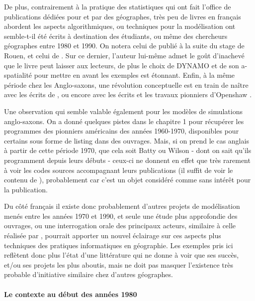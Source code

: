 De plus, contrairement à la pratique des statistiques qui ont fait l'office de publications dédiées pour et par des géographes, très peu de livres en français abordent les aspects algorithmiques, ou techniques pour la modélisation ont semble-t-il été écrits à destination des étudiants, ou même des chercheurs géographes entre 1980 et 1990. On notera celui de \textcite{Guermond1984} publié à la suite du stage de Rouen, et celui de \textcite{Dauphine1987}. Sur ce dernier, l'auteur lui-même admet le goût d'inachevé que le livre peut laisser aux lecteurs, de plus le choix de DYNAMO et de son a-spatialité pour mettre en avant les exemples est étonnant. Enfin, à la même période chez les Anglo-saxons, une révolution conceptuelle est en train de naître avec les écrits de \textcite{Couclelis1985}, ou encore avec les écrits et les travaux pionniers d'Openshaw \textcites{Openshaw1983, Openshaw1988, Openshaw2000}.

Une observation qui semble valable également pour les modèles de simulations anglo-saxons. On a donné quelques pistes dans le chapitre 1 pour récupérer les programmes des pionniers américains des années 1960-1970, disponibles pour certains sous forme de listing dans des ouvrages. Mais, si on prend le cas anglais à partir de cette période 1970, que cela soit Batty ou Wilson - dont on sait qu'ils programment  depuis leurs débuts - ceux-ci ne donnent en effet que très rarement à voir les codes sources accompagnant leurs publications (il suffit de voir le contenu de \textcite{Batty1976}), probablement car c'est un objet considéré comme sans intérêt pour la publication.

Du côté français il existe donc probablement d'autres projets de modélisation menés entre les années 1970 et 1990, et seule une étude plus approfondie des ouvrages, ou une interrogation orale des principaux acteurs, similaire à celle réalisée par \textcite{Cuyala2014}, pourrait apporter un nouvel éclairage sur ces aspects plus techniques des pratiques informatiques en géographie. Les exemples pris ici reflètent donc plus l'état d'une littérature qui ne donne à voir que ses succès, et/ou ses projets les plus aboutis, mais ne doit pas masquer l'existence très probable d'initiative similaire chez d'autres géographes.

\paragraph{Le contexte au début des années 1980}

